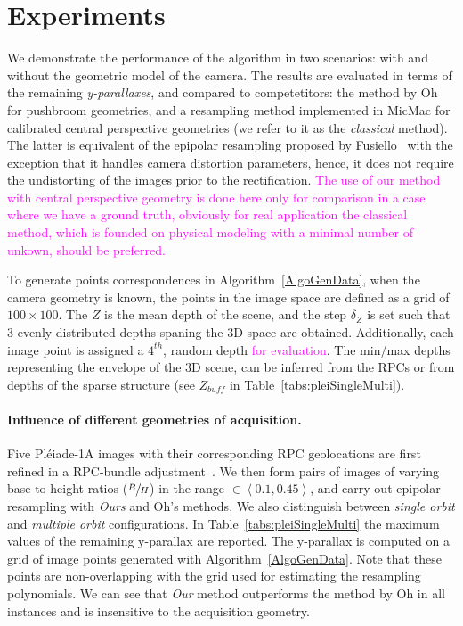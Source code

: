 \documentclass{ipol}
\newcommand{\mpd}[1]{\textcolor{magenta}{#1}}
\begin{document}

\section{Experiments}\label{sec:experiments}

We demonstrate the performance of the algorithm in two scenarios: with and without the geometric model of the camera. The results are evaluated in terms of the remaining \textit{y-parallaxes}, and compared to competetitors: the method by Oh~\cite{Oh2011} for pushbroom geometries, and a resampling method implemented in MicMac for calibrated central perspective geometries (we refer to it as the \textit{classical} method). The latter is equivalent of the epipolar resampling proposed by Fusiello~\cite{fusiello2000epi} with the exception that it handles camera distortion parameters, hence, it does not require the undistorting of the images prior to the rectification. \mpd{The use of our method with central perspective geometry is done here only for comparison in a case where we have a ground truth, obviously for real application the classical method, which is founded on physical modeling with a minimal number of unkown, should be preferred.}

%

To generate points correspondences in Algorithm~\ref{AlgoGenData}, when the camera geometry is known, the points in the image space are defined as a grid of $100 \times 100$. The $Z$ is the mean depth of the scene, and the step $\delta_Z$ is set such that 3 evenly distributed depths spaning the 3D space are obtained. Additionally, each image point is assigned a $4^{th}$, random depth \mpd{for evaluation}.  The min/max depths representing the envelope of the 3D scene, can be inferred from the RPCs or from  depths of the sparse structure (see $Z_{buff}$ in Table~\ref{tabs:pleiSingleMulti}).  
 

\paragraph{Influence of different geometries of acquisition.}
% 
Five Pl\'eiade-1A  images with their corresponding RPC geolocations are first refined in a RPC-bundle adjustment~\cite{rupnika2016refined}. We then form pairs of images of varying base-to-height ratios ($\sfrac{B}{H}$) in the range $\in \left< 0.1,0.45 \right> $, and carry out epipolar resampling with \textit{Ours} and Oh's methods. We also distinguish between \textit{single orbit} and \textit{multiple orbit} configurations. In Table~\ref{tabs:pleiSingleMulti} the maximum values of the remaining y-parallax are reported. The y-parallax is computed on a grid of image points generated with Algorithm~\ref{AlgoGenData}. Note that these points are non-overlapping with the grid used for estimating the resampling polynomials. We can see that \textit{Our} method outperforms the method by Oh in all instances and is insensitive to the acquisition geometry.
\end{document}

